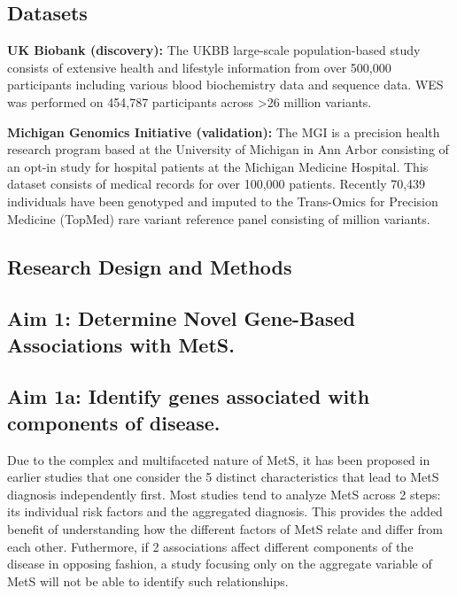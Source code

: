\documentclass[11pt]{article}
\begin{document}
\subsection*{Datasets}

\textbf{UK Biobank (discovery):} The UKBB large-scale population-based study consists of extensive health and lifestyle information from over 500,000 participants including various blood biochemistry data and sequence data. WES was performed on 454,787 participants across >26 million variants.

\textbf{Michigan Genomics Initiative (validation):} The MGI is a precision health research program based at the University of Michigan in Ann Arbor consisting of an opt-in study for hospital patients at the Michigan Medicine Hospital. This dataset consists of medical records for over 100,000 patients. Recently 70,439 individuals have been genotyped and imputed to the Trans-Omics for Precision Medicine (TopMed) rare variant reference panel consisting of  million variants.


\subsection*{Research Design and Methods}

\subsection*{Aim 1: Determine Novel Gene-Based Associations with MetS.}

\subsection*{Aim 1a: Identify genes associated with components of disease.} 

\noindent {}

Due to the complex and multifaceted nature of MetS, it has been proposed in earlier studies that one consider the 5 distinct characteristics that lead to MetS diagnosis independently first. Most studies tend to analyze MetS across 2 steps: its individual risk factors and the aggregated diagnosis. This provides the added benefit of understanding how the different factors of MetS relate and differ from each other. Futhermore, if 2 associations affect different components of the disease in opposing fashion, a study focusing only on the aggregate variable of MetS will not be able to identify such relationships.
\end{document}
